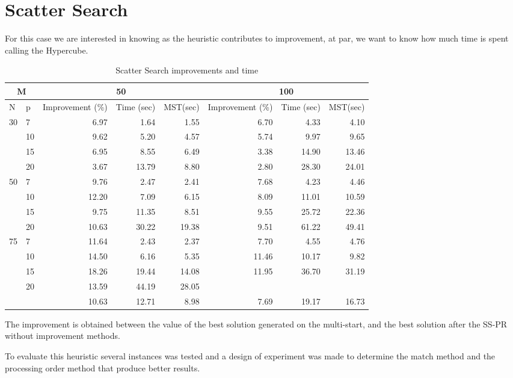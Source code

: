 \section{Scatter Search}
For this case
we are interested in knowing
as the heuristic contributes to improvement,
at par,
we want to know
how much time is spent
calling the Hypercube.

\begin{sidewaystable}
  \centering
  \begin{tabular}{|l|l|r|r|r|r|r|r|}
    \hline
    \multicolumn{2}{|c|}{M}
    & \multicolumn{3}{|c|}{50}
    & \multicolumn{3}{|c|}{100} \\ \hline 
    N & p & Improvement (\%) & Time (sec) & MST(sec)
    & Improvement (\%) & Time (sec) & MST(sec) \\ \hline
    \multirow{4}{*}{30}
    & 7 & 6.97 & 1.64 & 1.55
    & 6.70 & 4.33 & 4.10 \\
    & 10 & 9.62 & 5.20 & 4.57
    & 5.74 & 9.97 & 9.65 \\
    & 15 & 6.95 & 8.55 & 6.49
    & 3.38 & 14.90 & 13.46 \\
    & 20 & 3.67 & 13.79 & 8.80
    & 2.80 & 28.30 & 24.01 \\ \hline
    \multirow{4}{*}{50}
    & 7 & 9.76 & 2.47 & 2.41
    & 7.68 & 4.23 & 4.46 \\
    & 10 & 12.20 & 7.09 & 6.15
    & 8.09 & 11.01 & 10.59 \\
    & 15 & 9.75 & 11.35 & 8.51
    & 9.55 & 25.72 & 22.36 \\
    & 20 & 10.63 & 30.22 & 19.38
    & 9.51 & 61.22 & 49.41 \\ \hline
    \multirow{4}{*}{75}
    & 7 & 11.64 & 2.43 & 2.37
    & 7.70 & 4.55 & 4.76 \\
    & 10 & 14.50 & 6.16 & 5.35
    & 11.46 & 10.17 & 9.82 \\
    & 15 & 18.26 & 19.44 & 14.08
    & 11.95 & 36.70 & 31.19 \\
    & 20 & 13.59 & 44.19 & 28.05
    & & & \\ \hline
    & & 10.63 & 12.71 & 8.98
    & 7.69 & 19.17 & 16.73 \\
    \hline
  \end{tabular}
  \caption[Scatter Search]{Scatter Search improvements and time}
  \label{tab:SS}
\end{sidewaystable}
The improvement
is obtained
between the value of the best solution
generated on the multi-start,
and the best solution after the SS-PR
without improvement methods.

To evaluate this heuristic
several instances was tested
and
a design of experiment was made
to determine
the match method
and the processing order method
that produce better results.

